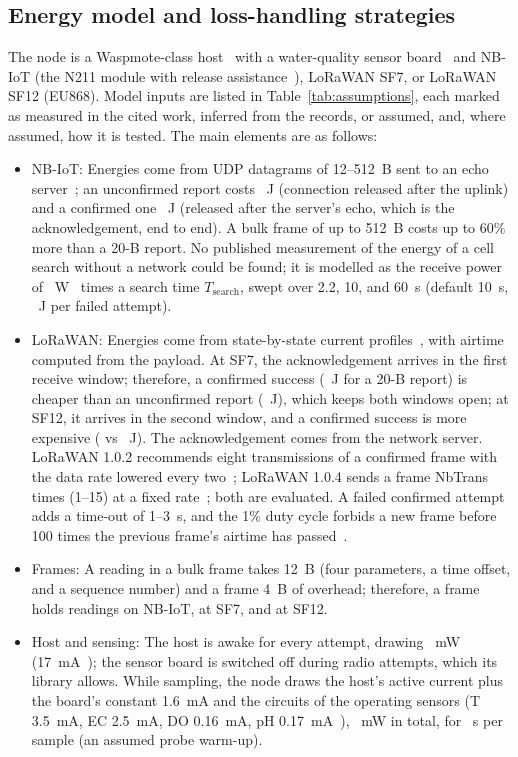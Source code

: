 \subsection{Energy model and loss-handling strategies}
\label{sec:data-energy}
The node is a Waspmote-class host~\cite{libeliumwaspmote} with a water-quality sensor board~\cite{libeliumsmartwater} and NB-IoT (the N211 module with release assistance~\cite{michelinakis2021dissecting}), LoRaWAN SF7, or LoRaWAN SF12 (EU868). Model inputs are listed in Table~\ref{tab:assumptions}, each marked as measured in the cited work, inferred from the records, or assumed, and, where assumed, how it is tested. The main elements are as follows:
\begin{itemize}
\item NB-IoT: Energies come from UDP datagrams of 12--512~B sent to an echo server~\cite{michelinakis2021dissecting}; an unconfirmed report costs \eNbUnconf~J (connection released after the uplink) and a confirmed one \eNbConf~J (released after the server's echo, which is the acknowledgement, end to end). A bulk frame of up to 512~B costs up to 60\% more than a 20-B report. No published measurement of the energy of a cell search without a network could be found; it is modelled as the receive power of \pRxNb~W~\cite{sorensen2022nbiot} times a search time $T_\mathrm{search}$, swept over 2.2, 10, and 60~s (default 10~s, \eNbSearch~J per failed attempt).
\item LoRaWAN: Energies come from state-by-state current profiles~\cite{casals2017lorawan}, with airtime computed from the payload. At SF7, the acknowledgement arrives in the first receive window; therefore, a confirmed success (\eSfSevenConf~J for a 20-B report) is cheaper than an unconfirmed report (\eSfSevenUnconf~J), which keeps both windows open; at SF12, it arrives in the second window, and a confirmed success is more expensive (\eSfTwelveConf{} vs \eSfTwelveUnconf~J). The acknowledgement comes from the network server. LoRaWAN 1.0.2 recommends eight transmissions of a confirmed frame with the data rate lowered every two~\cite{lora2016spec102}; LoRaWAN 1.0.4 sends a frame NbTrans times (1--15) at a fixed rate~\cite{lora2020spec104}; both are evaluated. A failed confirmed attempt adds a time-out of 1--3~s, and the 1\% duty cycle forbids a new frame before 100 times the previous frame's airtime has passed~\cite{lora2021rp002}.
\item Frames: A reading in a bulk frame takes 12~B (four parameters, a time offset, and a sequence number) and a frame 4~B of overhead; therefore, a frame holds \rpfNb{} readings on NB-IoT, \rpfSfSeven{} at SF7, and \rpfSfTwelve{} at SF12.
\item Host and sensing: The host is awake for every attempt, drawing \hostOnMW~mW (17~mA~\cite{libeliumwaspmote}); the sensor board is switched off during radio attempts, which its library allows. While sampling, the node draws the host's active current plus the board's constant 1.6~mA and the circuits of the operating sensors (T 3.5~mA, EC 2.5~mA, DO 0.16~mA, pH 0.17~mA~\cite{libeliumsmartwater}), \hostSenseMW~mW in total, for \tSenseS~s per sample (an assumed probe warm-up).
\end{itemize}
